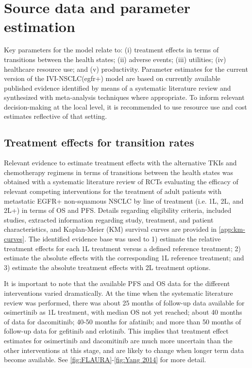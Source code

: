 \documentclass[11pt,final,fleqn]{article}\usepackage[]{graphicx}\usepackage[]{color}
\theoremstyle{plain}
\begin{document}
{\section{Source data and parameter estimation}\label{sec:data}
Key parameters for the model relate to: (i) treatment effects in terms of transitions between the health states; (ii) adverse events; (iii) utilities; (iv) healthcare resource use; and (v) productivity. Parameter estimates for the current version of the IVI-NSCLC(egfr+) model are based on currently available published evidence identified by means of a systematic literature review and synthesized with meta-analysis techniques where appropriate. To inform relevant decision-making at the local level, it is recommended to use resource use and cost estimates reflective of that setting. 

\subsection{Treatment effects for transition rates} \label{subsec:data-trans-rates}
Relevant evidence to estimate treatment effects with the alternative TKIs and chemotherapy regimens in terms of transitions between the health states was obtained with a systematic literature review of RCTs evaluating the efficacy of relevant competing interventions for the treatment of adult patients with metastatic EGFR+ non-squamous NSCLC by line of treatment (i.e. 1L, 2L, and 2L+) in terms of OS and PFS. Details regarding eligibility criteria, included studies, extracted information regarding study, treatment, and patient characteristics, and Kaplan-Meier (KM) survival curves are provided in \autoref{app:km-curves}. 
The identified evidence base was used to 1) estimate the relative treatment effects for each 1L treatment versus a defined reference treatment; 2) estimate the absolute effects with the corresponding 1L reference treatment; and 3) estimate the absolute treatment effects with 2L treatment options. 

It is important to note that the available PFS and OS data for the different interventions varied dramatically. At the time when the systematic literature review was performed, there was about 25 months of follow-up data available for osimertinib as 1L treatment, with median OS not yet reached; about 40 months of data for dacomitinib; 40-50 months for afatinib; and more than 50 months of follow-up data for gefitinib and erlotinib. This implies that treatment effect estimates for osimertinib and dacomitinib are much more uncertain than the other interventions at this stage, and are likely to change when longer term data become available. See \autoref{fig:FLAURA}-\autoref{fig:Yang 2014} for more detail.

}
\end{document}
